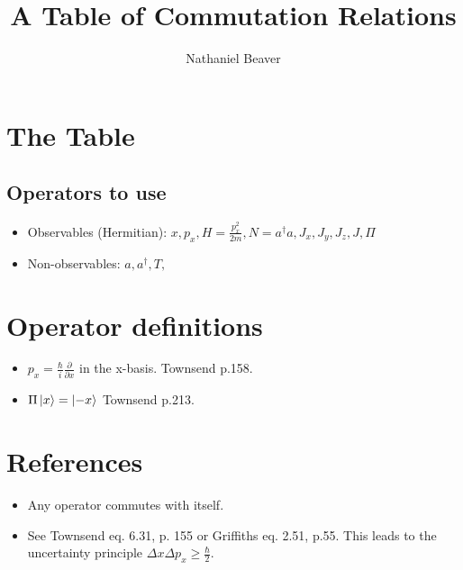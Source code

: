 \documentclass[12pt,letterpaper]{article}
\author{Nathaniel Beaver}
\title{A Table of Commutation Relations}
\begin{document}
\maketitle

\section{The Table}

\subsection{Operators to use}

\begin{itemize}
\item Observables (Hermitian): $x, p_x, H=\frac{p_x^2}{2m}, N=a^\dagger a, J_x, J_y, J_z, J, \hyperref[def_Pi]{\Pi}$
\item Non-observables: $a, a^\dagger, T, $
\end{itemize}



\renewcommand{\dtldisplayafterhead}{\hline} %
\renewcommand{\dtlstringalign}{r} %
\renewcommand{\dtlbetweencols}{|}

\newpage

\section{Operator definitions}
\begin{itemize}
\item \label{def_p_x} $p_x = \frac{\hbar}{i}\frac{\partial}{\partial x}$ in the x-basis. Townsend p.158.
\item \label{def_Pi} $\Pi\ket{x}=\ket{-x}$ Townsend p.213.
\end{itemize}

\section{References}
\begin{itemize}
\item \label{self} Any operator commutes with itself.
\item \label{unc} See Townsend eq. 6.31, p. 155 or Griffiths eq. 2.51, p.55. This leads to the uncertainty principle $\Delta x \Delta p_x \geq \frac{\hbar}{2}$.
\end{itemize}
\end{document}
